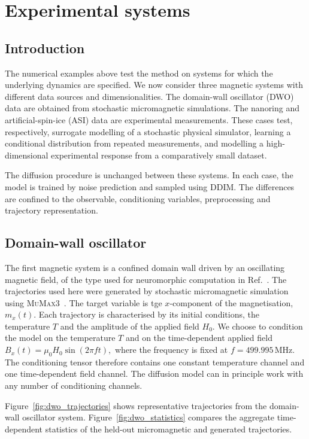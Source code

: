\section{Experimental systems}\label{sec:experimental}
\subsection{Introduction}
The numerical examples above test the method on systems for which the underlying dynamics are specified. We now consider three magnetic systems with different data sources and dimensionalities. The domain-wall oscillator (DWO) data are obtained from stochastic micromagnetic simulations. The nanoring and artificial-spin-ice (ASI) data are experimental measurements. These cases test, respectively, surrogate modelling of a stochastic physical simulator, learning a conditional distribution from repeated measurements, and modelling a high-dimensional experimental response from a comparatively small dataset.

The diffusion procedure is unchanged between these systems. In each case, the model is trained by noise prediction and sampled using DDIM. The differences are confined to the observable, conditioning variables, preprocessing and trajectory representation.

\subsection{Domain-wall oscillator}
\label{ssec}

The first magnetic system is a confined domain wall driven by an oscillating magnetic field, of the type used for neuromorphic computation in Ref.~\cite{ababei2021}. The trajectories used here were generated by stochastic micromagnetic simulation using \textsc{MuMax3}~\cite{vansteenkiste2014mumax3}. The target variable is tge $x$-component of the magnetisation, $m_x(t)$. Each trajectory is characterised by its initial conditions, the temperature $T$ and the amplitude of the applied field $H_0$.
We choose to condition the model on the temperature $T$ and on the time-dependent applied field $B_x(t)=\mu_0 H_0\sin(2\pi f t),$ where the frequency is fixed at $f=499.995\,\mathrm{MHz}.$ The conditioning tensor therefore contains one constant temperature channel and one time-dependent field channel. The diffusion model can in principle work with any number of conditioning channels.

Figure~\ref{fig:dwo_trajectories} shows representative trajectories from the domain-wall oscillator system. Figure~\ref{fig:dwo_statistics} compares the aggregate time-dependent statistics of the held-out micromagnetic and generated trajectories.

